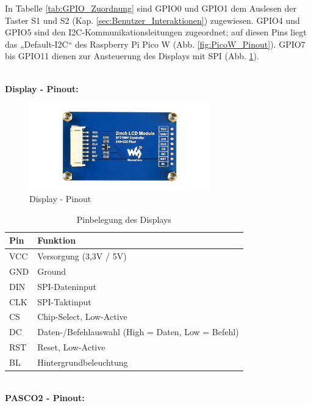 \begin{inhalt}
In Tabelle \ref{tab:GPIO_Zuordnung} sind GPIO0 und GPIO1 dem Auslesen der Taster S1 und S2 (Kap. \ref{sec:Benutzer_Interaktionen}) zugewiesen. GPIO4 und GPIO5 sind den I2C-Kommunikationsleitungen zugeordnet; auf diesen Pins liegt das „Default-I2C“ des Raspberry Pi Pico W (Abb. \ref{fig:PicoW_Pinout}). GPIO7 bis GPIO11 dienen zur Ansteuerung des Displays mit SPI (Abb. \ref{fig:Display_Pinout}).

\bigskip \\

\textbf{Display - Pinout:}

\begin{figure}[!htb]
\centering
\includegraphics[width=0.7\textwidth]{files/Tobias/pics/Pinout/2inch-LCD-Module-4_960.jpg}
\caption[Display - Pinout]{Display - Pinout}
\label{fig:Display_Pinout}
\end{figure}


\begin{table}[H]
\centering
\begin{tabular}{|l|l|}
\hline
\rowcolor{cyan!20}
\textbf{Pin} & \textbf{Funktion} \\
\hline
VCC & Versorgung (3{,}3V / 5V) \\
\hline
GND & Ground \\
\hline
DIN & SPI-Dateninput \\
\hline
CLK & SPI-Taktinput \\
\hline
CS & Chip-Select, Low-Active \\
\hline
DC & Daten-/Befehlauswahl (High = Daten, Low = Befehl) \\
\hline
RST & Reset, Low-Active \\
\hline
BL & Hintergrundbeleuchtung \\
\hline
\end{tabular}
\caption{Pinbelegung des Displays}
\label{tab:display_pins}
\end{table}

\bigskip \\

\textbf{PASCO2 - Pinout:}


\end{inhalt}
